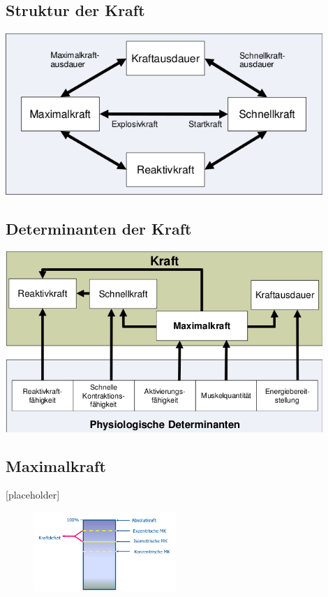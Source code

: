 \subsection{Struktur der Kraft}

\includegraphics[width=0.9\textwidth]{pictures/kraftstruktur}

\subsection{Determinanten der Kraft}
\includegraphics[width=0.9\textwidth]{pictures/kraft_determinanten}

\subsection{Maximalkraft}

[placeholder] %

\begin{figure}
    \begin{center}
        \includegraphics[width=0.48\textwidth]{pictures/maximalkraftvarianten}
    \end{center}
\end{figure}

